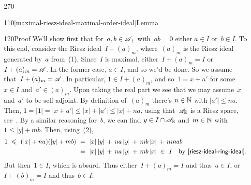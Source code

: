 \begin{parsec}{270}
\begin{point}{110}[maximal-riesz-ideal-maximal-order-ideal]{Lemma}
\begin{point}{120}{Proof}
We'll show first that for~$a,b\in\mathscr{A}_{+}$
with~$ab=0$ either $a\in I$ or~$b\in I$.
To this end, consider
the Riesz ideal~$I+(a)_m$,
where~$(a)_m$ is the Riesz ideal generated by~$a$
from~(1).
Since~$I$ is maximal, either~$I+(a)_m=I$
or~$I+(a)_m=\mathscr{A}$.
In the former case, $a\in I$,
and so we'd be done.
So we assume that~$I+(a)_m=\mathscr{A}$.
In particular, $1\in I+(a)_m$,
and so~$1=x+a'$ for some~$x\in I$ and~$a'\in (a)_m$.
Upon taking the real part
we see that we may assume~$x$ and~$a'$ to be self-adjoint.
By definition of~$(a)_m$ there's $n\in \mathbb{N}$ with
$\left|a'\right|\leq na$.
Then, $1=\left|1\right|=\left|x+a'\right|
\leq \left|x\right| + \left|a'\right|
\leq \left|x\right| + na$,
using that~$\mathscr{A}_{\mathbb{R}}$ is a Riesz space,
see~.
By a similar reasoning for~$b$,
we can find $y\in I\cap\mathscr{A}_{\mathbb{R}}$
and~$m\in\mathbb{N}$ with $1\leq\left|y\right|+mb$.
Then,
using~(2),
\begin{alignat*}{3}
1 \ \leq\ (\left|x\right| + na)(\left|y\right|+mb)
\ &= \ \left|x\right|\left|y\right| \,+\,
na\left|y\right|\,+\, mb\left|x\right|\,+\,nmab\\
\ &= \ \left|x\right|\left|y\right| \,+\,
na\left|y\right|\,+\, mb\left|x\right|
\ \in\ I\quad \text{by \sref{riesz-ideal-ring-ideal}.}
\end{alignat*}
But then~$1\in I$, which is absurd.
Thus either~$I+(a)_m=I$ and thus~$a\in I$,
or~$I+(b)_m = I$ and thus~$b\in I$.


\end{point}
\end{point}
\end{parsec}
